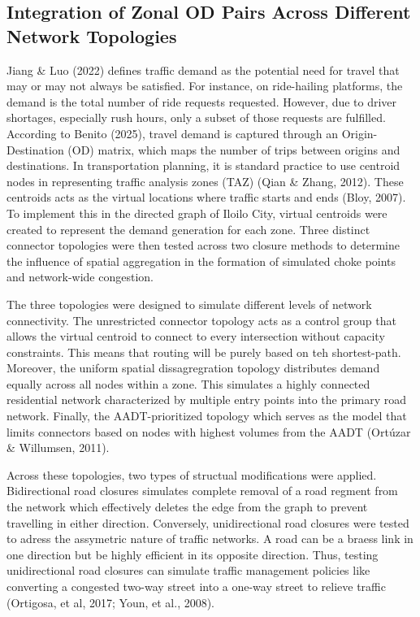 \subsection{Integration of Zonal OD Pairs Across Different Network Topologies}
\label{sec:setups}


Jiang \& Luo (2022) defines traffic demand as the potential need for travel that may or may not always be satisfied. For instance, on ride-hailing platforms, the demand is the total number of ride requests requested. However, due to driver shortages, especially rush hours, only a subset of those requests are fulfilled. According to Benito (2025), travel demand is captured through an Origin-Destination (OD) matrix, which maps the number of trips between origins and destinations. In transportation planning, it is standard practice to use centroid nodes in representing traffic analysis zones (TAZ) (Qian \& Zhang, 2012). These centroids acts as the virtual locations where traffic starts and ends (Bloy, 2007). To implement this in the directed graph of Iloilo City, virtual centroids were created to represent the demand generation for each zone.  Three distinct connector topologies were then tested across two closure methods to determine the influence of spatial aggregation in the formation of simulated choke points and network-wide congestion. 

The three topologies were designed to simulate different levels of network connectivity. The unrestricted connector topology acts as a control group that allows the virtual centroid to connect to every intersection without capacity constraints. This means that routing will be purely based on teh shortest-path. Moreover, the uniform spatial dissagregration topology distributes demand equally across all nodes within a zone. This simulates a highly connected residential network characterized by multiple entry points into the primary road network. Finally, the AADT-prioritized topology which serves as the model that limits connectors based on nodes with highest volumes from the AADT (Ortúzar \& Willumsen, 2011).

Across these topologies, two types of structual modifications were applied. Bidirectional road closures simulates complete removal of a road regment from the network which effectively deletes the edge from the graph to prevent travelling in either direction. Conversely, unidirectional road closures were tested to adress the assymetric nature of traffic networks. A road can be a braess link in one direction but be highly efficient in its opposite direction. Thus, testing unidirectional road closures can simulate traffic management policies like converting a congested two-way street into a one-way street to relieve traffic (Ortigosa, et al, 2017; Youn, et al., 2008).

